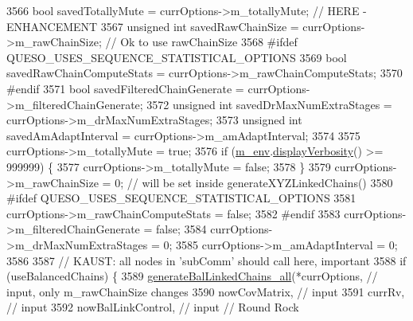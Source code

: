 \begin{DoxyCode}
3566         \textcolor{keywordtype}{bool}         savedTotallyMute           = currOptions->m\_totallyMute; \textcolor{comment}{// HERE - ENHANCEMENT}
3567         \textcolor{keywordtype}{unsigned} \textcolor{keywordtype}{int} savedRawChainSize          = currOptions->m\_rawChainSize; \textcolor{comment}{// Ok to use rawChainSize}
3568 \textcolor{preprocessor}{#ifdef QUESO\_USES\_SEQUENCE\_STATISTICAL\_OPTIONS}
3569 \textcolor{preprocessor}{}        \textcolor{keywordtype}{bool}         savedRawChainComputeStats  = currOptions->m\_rawChainComputeStats;
3570 \textcolor{preprocessor}{#endif}
3571 \textcolor{preprocessor}{}        \textcolor{keywordtype}{bool}         savedFilteredChainGenerate = currOptions->m\_filteredChainGenerate;
3572         \textcolor{keywordtype}{unsigned} \textcolor{keywordtype}{int} savedDrMaxNumExtraStages   = currOptions->m\_drMaxNumExtraStages;
3573         \textcolor{keywordtype}{unsigned} \textcolor{keywordtype}{int} savedAmAdaptInterval       = currOptions->m\_amAdaptInterval;
3574 
3575         currOptions->m\_totallyMute = \textcolor{keyword}{true};
3576         \textcolor{keywordflow}{if} (\hyperlink{class_q_u_e_s_o_1_1_m_l_sampling_a13f1ca4fe9f94822fe572a743eaced1d}{m\_env}.\hyperlink{class_q_u_e_s_o_1_1_base_environment_a1fe5f244fc0316a0ab3e37463f108b96}{displayVerbosity}() >= 999999) \{
3577           currOptions->m\_totallyMute = \textcolor{keyword}{false};
3578         \}
3579         currOptions->m\_rawChainSize          = 0; \textcolor{comment}{// will be set inside generateXYZLinkedChains()}
3580 \textcolor{preprocessor}{#ifdef QUESO\_USES\_SEQUENCE\_STATISTICAL\_OPTIONS}
3581 \textcolor{preprocessor}{}        currOptions->m\_rawChainComputeStats  = \textcolor{keyword}{false};
3582 \textcolor{preprocessor}{#endif}
3583 \textcolor{preprocessor}{}        currOptions->m\_filteredChainGenerate = \textcolor{keyword}{false};
3584         currOptions->m\_drMaxNumExtraStages   = 0;
3585         currOptions->m\_amAdaptInterval       = 0;
3586 
3587         \textcolor{comment}{// KAUST: all nodes in 'subComm' should call here, important}
3588         \textcolor{keywordflow}{if} (useBalancedChains) \{
3589           \hyperlink{class_q_u_e_s_o_1_1_m_l_sampling_a8e9d7681d17623c726814d206c8be4b2}{generateBalLinkedChains\_all}(*currOptions,       \textcolor{comment}{// input, only
       m\_rawChainSize changes}
3590                                       nowCovMatrix,       \textcolor{comment}{// input}
3591                                       currRv,             \textcolor{comment}{// input}
3592                                       nowBalLinkControl,  \textcolor{comment}{// input // Round Rock}

\end{DoxyCode}
